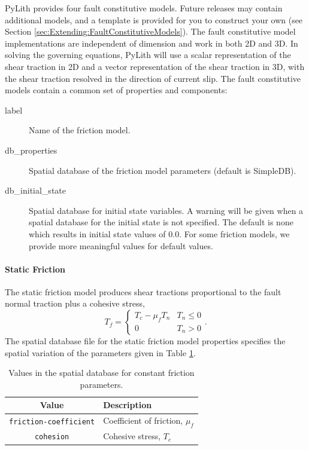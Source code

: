 PyLith provides four fault constitutive models. Future releases may
contain additional models, and a template is provided for you to construct
your own (see Section \ref{sec:Extending:FaultConstitutiveModels}).
The fault constitutive model implementations are independent of dimension
and work in both 2D and 3D. In solving the governing equations, PyLith
will use a scalar representation of the shear traction in 2D and a
vector representation of the shear traction in 3D, with the shear
traction resolved in the direction of current slip. The fault constitutive
models contain a common set of properties and components:
\begin{description}
\item [{label}] Name of the friction model.
\item [{db\_properties}] Spatial database of the friction model parameters
(default is SimpleDB).
\item [{db\_initial\_state}] Spatial database for initial state variables.
A warning will be given when a spatial database for the initial state
is not specified. The default is none which results in initial state
values of 0.0. For some friction models, we provide more meaningful
values for default values.
\end{description}

\paragraph{Static Friction}

The static friction model produces shear tractions proportional to
the fault normal traction plus a cohesive stress,
\begin{equation}
T_{f}=\begin{cases}
T_{c}-\mu_{f}T_{n} & T_{n}\leq0\\
0 & T_{n}>0
\end{cases}.
\end{equation}
The spatial database file for the static friction model properties
specifies the spatial variation of the parameters given in Table \ref{tab:static:friction:properties}.

\noindent \begin{center}
\begin{table}[H]
\noindent \centering{}\caption{\label{tab:static:friction:properties}Values in the spatial database
for constant friction parameters.}
\medskip{}
\begin{tabular}{|c|>{\raggedright}p{2.5in}|}
\hline 
\textbf{Value} & \centering{}\textbf{Description}\tabularnewline
\hline 
\hline 
\texttt{friction-coefficient} & \centering{}Coefficient of friction, $\mu_{f}$\tabularnewline
\hline 
\texttt{cohesion} & \centering{}Cohesive stress, $T_{c}$\tabularnewline
\hline 
\end{tabular}
\end{table}

\par\end{center}


